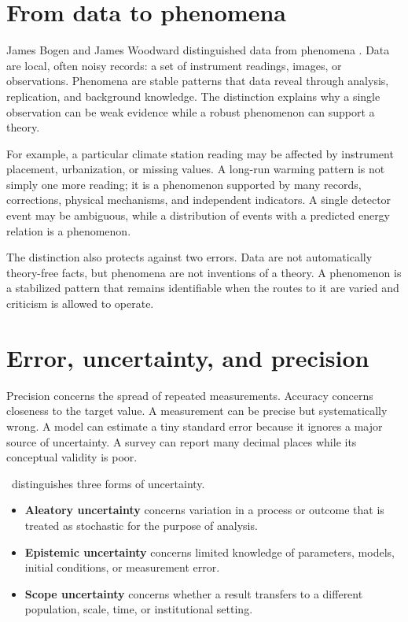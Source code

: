 \section{From data to phenomena}

James Bogen and James Woodward distinguished data from phenomena
\citep{bogenwoodward1988}. Data are local, often noisy records: a set of
instrument readings, images, or observations. Phenomena are stable patterns
that data reveal through analysis, replication, and background knowledge. The
distinction explains why a single observation can be weak evidence while a
robust phenomenon can support a theory.

For example, a particular climate station reading may be affected by
instrument placement, urbanization, or missing values. A long-run warming
pattern is not simply one more reading; it is a phenomenon supported by many
records, corrections, physical mechanisms, and independent indicators. A
single detector event may be ambiguous, while a distribution of events with a
predicted energy relation is a phenomenon.

The distinction also protects against two errors. Data are not automatically
theory-free facts, but phenomena are not inventions of a theory. A phenomenon
is a stabilized pattern that remains identifiable when the routes to it are
varied and criticism is allowed to operate.

\section{Error, uncertainty, and precision}

Precision concerns the spread of repeated measurements. Accuracy concerns
closeness to the target value. A measurement can be precise but systematically
wrong. A model can estimate a tiny standard error because it ignores a major
source of uncertainty. A survey can report many decimal places while its
conceptual validity is poor.

\RCR\ distinguishes three forms of uncertainty.

\begin{itemize}
\item \textbf{Aleatory uncertainty} concerns variation in a process or outcome
that is treated as stochastic for the purpose of analysis.
\item \textbf{Epistemic uncertainty} concerns limited knowledge of parameters,
models, initial conditions, or measurement error.
\item \textbf{Scope uncertainty} concerns whether a result transfers to a
different population, scale, time, or institutional setting.
\end{itemize}

